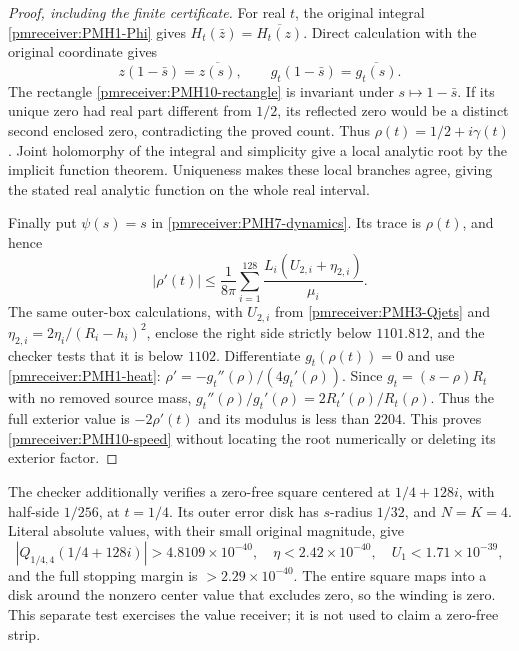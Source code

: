 \begin{proof}[Proof, including the finite certificate]
For real $t$, the original integral \eqref{pmreceiver:PMH1-Phi} gives
$H_t(\bar z)=\overline{H_t(z)}$. Direct calculation with the
original coordinate gives
\[
 z(1-\bar s)=\overline{z(s)},\qquad
 g_t(1-\bar s)=\overline{g_t(s)}.
\]
The rectangle \eqref{pmreceiver:PMH10-rectangle} is invariant under
$s\mapsto1-\bar s$. If its unique zero had real part different
from $1/2$, its reflected zero would be a distinct second enclosed
zero, contradicting the proved count. Thus
$\rho(t)=1/2+i\gamma(t)$. Joint holomorphy of the integral and
simplicity give a local analytic root by the implicit function
theorem. Uniqueness makes these local branches agree, giving the
stated real analytic function on the whole real interval.

Finally put $\psi(s)=s$ in \eqref{pmreceiver:PMH7-dynamics}. Its trace is
$\rho(t)$, and hence
\begin{equation}\label{pmreceiver:PMH10-velocity-certificate}
 |\rho'(t)|\le\frac1{8\pi}\sum_{i=1}^{128}
        \frac{L_i(U_{2,i}+\eta_{2,i})}{\mu_i}.
\end{equation}
The same outer-box calculations, with $U_{2,i}$ from
\eqref{pmreceiver:PMH3-Qjets} and
$\eta_{2,i}=2\eta_i/(R_i-h_i)^2$, enclose the right side strictly
below $1101.812$, and the checker tests that it is below $1102$.
Differentiate $g_t(\rho(t))=0$ and use
\eqref{pmreceiver:PMH1-heat}: $\rho'=-g_t''(\rho)/(4g_t'(\rho))$.
Since $g_t=(s-\rho)R_t$ with no removed source mass,
$g_t''(\rho)/g_t'(\rho)=2R_t'(\rho)/R_t(\rho)$.
Thus the full exterior value is $-2\rho'(t)$ and its modulus is
less than $2204$. This proves \eqref{pmreceiver:PMH10-speed} without locating
the root numerically or deleting its exterior factor.
\end{proof}

The checker additionally verifies a zero-free square centered at
$1/4+128i$, with half-side $1/256$, at $t=1/4$. Its outer error disk
has $s$-radius $1/32$, and $N=K=4$. Literal absolute values, with
their small original magnitude, give
\[
 |Q_{1/4,4}(1/4+128i)|>4.8109\times10^{-40},\quad
 \eta<2.42\times10^{-40},\quad U_1<1.71\times10^{-39},
\]
and the full stopping margin is $>2.29\times10^{-40}$.
The entire square maps into a disk around the nonzero center
value that excludes zero, so the winding is zero. This separate
test exercises the value receiver; it is not used to claim a
zero-free strip.

